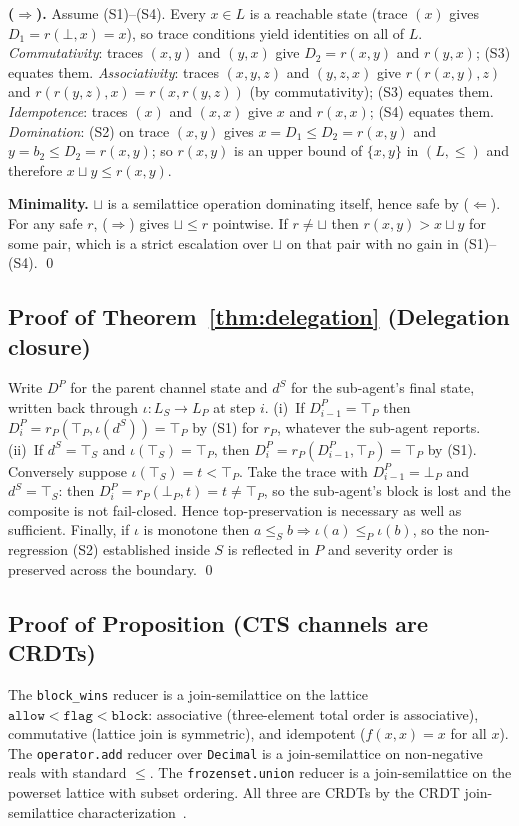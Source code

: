 \documentclass{article}
\begin{document}
\textbf{($\Rightarrow$).} Assume (S1)--(S4). Every $x\in L$ is a reachable state (trace $(x)$ gives
$D_1=r(\bot,x)=x$), so trace conditions yield identities on all of $L$.
\emph{Commutativity}: traces $(x,y)$ and $(y,x)$ give $D_2=r(x,y)$ and $r(y,x)$; (S3) equates them.
\emph{Associativity}: traces $(x,y,z)$ and $(y,z,x)$ give $r(r(x,y),z)$ and $r(r(y,z),x)=r(x,r(y,z))$
(by commutativity); (S3) equates them.
\emph{Idempotence}: traces $(x)$ and $(x,x)$ give $x$ and $r(x,x)$; (S4) equates them.
\emph{Domination}: (S2) on trace $(x,y)$ gives $x=D_1\le D_2=r(x,y)$ and $y=b_2\le D_2=r(x,y)$; so
$r(x,y)$ is an upper bound of $\{x,y\}$ in $(L,\le)$ and therefore $x\sqcup y\le r(x,y)$.

\textbf{Minimality.} $\sqcup$ is a semilattice operation dominating itself, hence safe by
($\Leftarrow$). For any safe $r$, ($\Rightarrow$) gives $\sqcup\le r$ pointwise. If $r\ne\sqcup$
then $r(x,y)>x\sqcup y$ for some pair, which is a strict escalation over $\sqcup$ on that pair
with no gain in (S1)--(S4). \qed

\subsection{Proof of Theorem~\ref{thm:delegation} (Delegation closure)}

Write $D^P$ for the parent channel state and $d^S$ for the sub-agent's final state, written
back through $\iota:L_S\to L_P$ at step $i$.
(i)~If $D^P_{i-1}=\top_P$ then $D^P_i=r_P(\top_P,\iota(d^S))=\top_P$ by (S1) for $r_P$,
whatever the sub-agent reports.
(ii)~If $d^S=\top_S$ and $\iota(\top_S)=\top_P$, then $D^P_i=r_P(D^P_{i-1},\top_P)=\top_P$ by
(S1). Conversely suppose $\iota(\top_S)=t<\top_P$. Take the trace with $D^P_{i-1}=\bot_P$ and
$d^S=\top_S$: then $D^P_i=r_P(\bot_P,t)=t\ne\top_P$, so the sub-agent's block is lost and the
composite is not fail-closed. Hence top-preservation is necessary as well as sufficient.
Finally, if $\iota$ is monotone then $a\le_S b\Rightarrow\iota(a)\le_P\iota(b)$, so the
non-regression (S2) established inside $S$ is reflected in $P$ and severity order is preserved
across the boundary. \qed

\subsection{Proof of Proposition (CTS channels are CRDTs)}

The \texttt{block\_wins} reducer is a join-semilattice on the lattice $\texttt{allow} < \texttt{flag} < \texttt{block}$: associative (three-element total order is associative), commutative (lattice join is symmetric), and idempotent ($f(x,x) = x$ for all $x$). The \texttt{operator.add} reducer over \texttt{Decimal} is a join-semilattice on non-negative reals with standard $\leq$. The \texttt{frozenset.union} reducer is a join-semilattice on the powerset lattice with subset ordering. All three are CRDTs by the CRDT join-semilattice characterization~\cite{crdts}.
\end{document}

